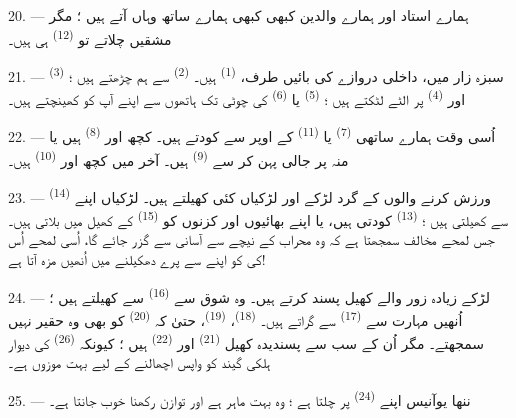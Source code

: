 20. --- ہمارے استاد اور ہمارے والدین کبھی کبھی ہمارے ساتھ وہاں آتے
ہیں ؛ مگر مشقیں چلاتے تو \textsuperscript{(12)} ہی ہیں۔

21. --- سبزہ زار میں، داخلی دروازے کی بائیں طرف، \textsuperscript{(1)} ہیں۔ \textsuperscript{(2)} سے
ہم چڑھتے ہیں ؛ \textsuperscript{(3)} اور \textsuperscript{(4)} پر الٹے لٹکتے ہیں ؛ \textsuperscript{(5)} یا \textsuperscript{(6)} کی چوٹی تک ہاتھوں سے اپنے آپ کو کھینچتے
ہیں۔

22. --- اُسی وقت ہمارے ساتھی \textsuperscript{(7)} یا \textsuperscript{(11)}
کے اوپر سے کودتے ہیں۔ کچھ اور \textsuperscript{(8)} ہیں یا منہ پر جالی پہن کر 
سے \textsuperscript{(9)} ہیں۔ آخر میں کچھ اور
\textsuperscript{(10)} ہیں۔

\VUsaut{4.6mm}
\VUsaut{3.0mm}

23. --- ورزش کرنے والوں کے گرد لڑکے اور لڑکیاں کئی 
کھیلتے ہیں۔ لڑکیاں اپنے \textsuperscript{(14)} سے
کھیلتی ہیں ؛ \textsuperscript{(13)} کودتی ہیں، یا اپنے
بھائیوں اور کزنوں کو \textsuperscript{(15)} کے کھیل میں
بلاتی ہیں۔ جس لمحے مخالف سمجھتا ہے کہ وہ محراب کے نیچے سے آسانی سے
گزر جائے گا، اُسی لمحے اُس کی  کو اپنے  سے پرے دھکیلنے میں اُنھیں مزہ آتا ہے!

24. --- لڑکے زیادہ زور والے کھیل پسند کرتے ہیں۔ وہ شوق سے
\textsuperscript{(16)} سے کھیلتے ہیں ؛ اُنھیں مہارت سے
\textsuperscript{(17)} سے گراتے ہیں۔ 
\textsuperscript{(18)}، \textsuperscript{(19)}، حتیٰ کہ
\textsuperscript{(20)} کو بھی وہ حقیر نہیں
سمجھتے۔ مگر اُن کے سب سے پسندیدہ کھیل \textsuperscript{(21)}
اور \textsuperscript{(22)} ہیں ؛ کیونکہ
\textsuperscript{(26)} کی دیوار ہلکی گیند کو واپس
اچھالنے کے لیے بہت موزوں ہے۔

25. --- ننھا یوآنیس اپنے \textsuperscript{(24)} پر
چلتا ہے ؛ وہ بہت ماہر ہے اور توازن رکھنا خوب جانتا ہے۔

